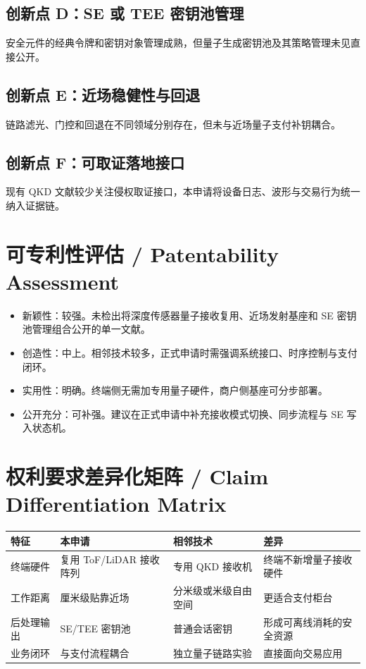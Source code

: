 ﻿\documentclass[12pt,a4paper]{article}
\begin{document}
\subsection{创新点 D：SE 或 TEE 密钥池管理}
安全元件的经典令牌和密钥对象管理成熟，但量子生成密钥池及其策略管理未见直接公开。

\subsection{创新点 E：近场稳健性与回退}
链路滤光、门控和回退在不同领域分别存在，但未与近场量子支付补钥耦合。

\subsection{创新点 F：可取证落地接口}
现有 QKD 文献较少关注侵权取证接口，本申请将设备日志、波形与交易行为统一纳入证据链。

\section{可专利性评估 / Patentability Assessment}
\begin{itemize}
\item 新颖性：较强。未检出将深度传感器量子接收复用、近场发射基座和 SE 密钥池管理组合公开的单一文献。
\item 创造性：中上。相邻技术较多，正式申请时需强调系统接口、时序控制与支付闭环。
\item 实用性：明确。终端侧无需加专用量子硬件，商户侧基座可分步部署。
\item 公开充分：可补强。建议在正式申请中补充接收模式切换、同步流程与 SE 写入状态机。
\end{itemize}

\section{权利要求差异化矩阵 / Claim Differentiation Matrix}
\begin{tabular}{|p{2.8cm}|p{3.8cm}|p{3.8cm}|p{2.8cm}|}
\hline
特征 & 本申请 & 相邻技术 & 差异 \\
\hline
终端硬件 & 复用 ToF/LiDAR 接收阵列 & 专用 QKD 接收机 & 终端不新增量子接收硬件 \\
\hline
工作距离 & 厘米级贴靠近场 & 分米级或米级自由空间 & 更适合支付柜台 \\
\hline
后处理输出 & SE/TEE 密钥池 & 普通会话密钥 & 形成可离线消耗的安全资源 \\
\hline
业务闭环 & 与支付流程耦合 & 独立量子链路实验 & 直接面向交易应用 \\
\hline
\end{tabular}
\end{document}
